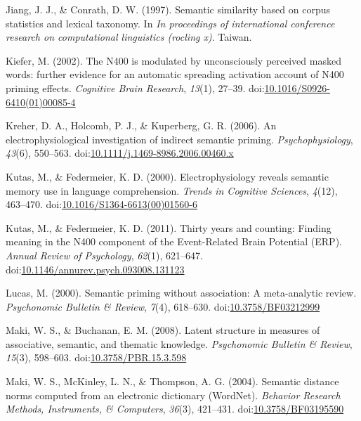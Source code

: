 \documentclass[english,man]{apa6}
\theoremstyle{definition}
\theoremstyle{definition}
\theoremstyle{definition}
\theoremstyle{remark}
\begin{document}
\hypertarget{ref-Jiang1997}{}
Jiang, J. J., \& Conrath, D. W. (1997). Semantic similarity based on
corpus statistics and lexical taxonomy. In \emph{In proceedings of
international conference research on computational linguistics (rocling
x)}. Taiwan.

\hypertarget{ref-Kiefer2002}{}
Kiefer, M. (2002). The N400 is modulated by unconsciously perceived
masked words: further evidence for an automatic spreading activation
account of N400 priming effects. \emph{Cognitive Brain Research},
\emph{13}(1), 27--39.
doi:\href{https://doi.org/10.1016/S0926-6410(01)00085-4}{10.1016/S0926-6410(01)00085-4}

\hypertarget{ref-Kreher2006}{}
Kreher, D. A., Holcomb, P. J., \& Kuperberg, G. R. (2006). An
electrophysiological investigation of indirect semantic priming.
\emph{Psychophysiology}, \emph{43}(6), 550--563.
doi:\href{https://doi.org/10.1111/j.1469-8986.2006.00460.x}{10.1111/j.1469-8986.2006.00460.x}

\hypertarget{ref-Kutas2000}{}
Kutas, M., \& Federmeier, K. D. (2000). Electrophysiology reveals
semantic memory use in language comprehension. \emph{Trends in Cognitive
Sciences}, \emph{4}(12), 463--470.
doi:\href{https://doi.org/10.1016/S1364-6613(00)01560-6}{10.1016/S1364-6613(00)01560-6}

\hypertarget{ref-Kutas2011}{}
Kutas, M., \& Federmeier, K. D. (2011). Thirty years and counting:
Finding meaning in the N400 component of the Event-Related Brain
Potential (ERP). \emph{Annual Review of Psychology}, \emph{62}(1),
621--647.
doi:\href{https://doi.org/10.1146/annurev.psych.093008.131123}{10.1146/annurev.psych.093008.131123}

\hypertarget{ref-Lucas2000}{}
Lucas, M. (2000). Semantic priming without association: A meta-analytic
review. \emph{Psychonomic Bulletin \& Review}, \emph{7}(4), 618--630.
doi:\href{https://doi.org/10.3758/BF03212999}{10.3758/BF03212999}

\hypertarget{ref-Maki2008}{}
Maki, W. S., \& Buchanan, E. M. (2008). Latent structure in measures of
associative, semantic, and thematic knowledge. \emph{Psychonomic
Bulletin \& Review}, \emph{15}(3), 598--603.
doi:\href{https://doi.org/10.3758/PBR.15.3.598}{10.3758/PBR.15.3.598}

\hypertarget{ref-Maki2004}{}
Maki, W. S., McKinley, L. N., \& Thompson, A. G. (2004). Semantic
distance norms computed from an electronic dictionary (WordNet).
\emph{Behavior Research Methods, Instruments, \& Computers},
\emph{36}(3), 421--431.
doi:\href{https://doi.org/10.3758/BF03195590}{10.3758/BF03195590}
\end{document}
